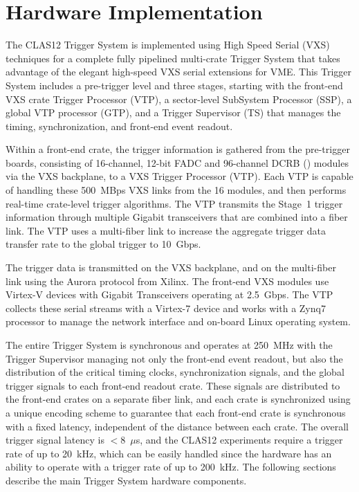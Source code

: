 \section{Hardware Implementation}

The CLAS12 Trigger System is implemented using High Speed Serial (VXS) techniques for a complete fully
pipelined multi-crate Trigger System that takes advantage of the elegant high-speed VXS serial extensions
for VME.  This Trigger System includes a pre-trigger level and three stages, starting with the front-end VXS
crate Trigger Processor (VTP), a sector-level SubSystem Processor (SSP), a global VTP processor (GTP), and
a Trigger Supervisor (TS) that manages the timing, synchronization, and front-end event readout.

Within a front-end crate, the trigger information is gathered from the pre-trigger boards, consisting of
16-channel, 12-bit FADC and 96-channel DCRB (\cite{daq-ref}) modules via the VXS backplane, to a VXS
Trigger Processor (VTP). Each VTP is capable of handling these 500~MBps VXS links from the 16 modules, and
then performs real-time crate-level trigger algorithms.  The VTP transmits the Stage~1 trigger information
through multiple Gigabit transceivers that are combined into a fiber link. The VTP uses a multi-fiber link to
increase the aggregate trigger data transfer rate to the global trigger to 10~Gbps.

The trigger data is transmitted on the VXS backplane, and on the multi-fiber link using the Aurora protocol
from Xilinx.  The front-end VXS modules use Virtex-V devices with Gigabit Transceivers operating at
2.5~Gbps. The VTP collects these serial streams with a Virtex-7 device and works with a Zynq7 processor to
manage the network interface and on-board Linux operating system.

The entire Trigger System is synchronous and operates at 250~MHz with the Trigger Supervisor managing
not only the front-end event readout, but also the distribution of the critical timing clocks, synchronization
signals, and the global trigger signals to each front-end readout crate.  These signals are distributed to the
front-end crates on a separate fiber link, and each crate is synchronized using a unique encoding scheme to
guarantee that each front-end crate is synchronous with a fixed latency, independent of the distance between
each crate.  The overall trigger signal latency is $<$8~$\mu$s, and the CLAS12 experiments require a trigger
rate of up to 20~kHz, which can be easily handled since the hardware has an ability to operate with a trigger
rate of up to 200~kHz. The following sections describe the main Trigger System hardware components.

